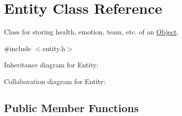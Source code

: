 \hypertarget{classEntity}{}\section{Entity Class Reference}
\label{classEntity}


Class for storing health, emotion, team, etc. of an \hyperlink{classObject}{Object}.  




{\ttfamily \#include $<$entity.\+h$>$}



Inheritance diagram for Entity\+:


Collaboration diagram for Entity\+:
\subsection*{Public Member Functions}
